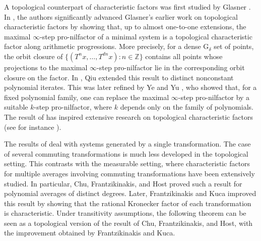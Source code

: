 \documentclass[11pt,reqno]{amsart}
\newcommand{\Z}{\mathbb{Z}}
\theoremstyle{definition}
\theoremstyle{remark}
\begin{document}
A topological counterpart of characteristic factors was first studied by Glasner \cite{Glasner_top_erg_decomposition:1994}.  In \cite{Glasner_Huang_Shao_Weiss_Ye_Topological_characteristic_factors:2020}, the authors significantly advanced Glasner’s earlier work on topological characteristic factors by showing that, up to almost one-to-one extensions, the maximal $\infty$-step pro-nilfactor of a minimal system is a topological characteristic factor along arithmetic progressions. More precisely, for a dense G$_\delta$ set of points, the orbit closure of $\{(T^nx,\dots,T^{dn}x):n\in \Z\}$ contains all points whose projections to the maximal $\infty$-step pro-nilfactor lie in the corresponding orbit closure on the factor.  In \cite{Qiu_poly_orbits_tot_minimal:2023}, Qiu extended this result to distinct nonconstant polynomial iterates. This was later refined by Ye and Yu \cite{Ye_Yu_polynomial_saturation:2025}, who showed that, for a fixed polynomial family, one can replace the maximal $\infty$-step pro-nilfactor by a suitable $k$-step pro-nilfactor, where $k$ depends only on the family of polynomials. The result of \cite{Glasner_Huang_Shao_Weiss_Ye_Topological_characteristic_factors:2020} has inspired extensive research on topological characteristic factors (see for instance \cite{Alvarez_regionally_proximal_tfc_group_actions:2026,Qiu_poly_orbits_tot_minimal:2023,Qiu_Yu_saturated_cubes_measure:2023,Shao_Xu_saturation_R_flows:2025,Qiu_Xu_Ye_Yu_saturation_product:2025,Wu_Yu_saturation_product_pol:2026}).

The results of \cite{Glasner_Huang_Shao_Weiss_Ye_Topological_characteristic_factors:2020,Qiu_poly_orbits_tot_minimal:2023,Ye_Yu_polynomial_saturation:2025} deal with systems generated by a single transformation. The case of several commuting transformations is much less developed in the topological setting. This contrasts with the measurable setting, where characteristic factors for multiple averages involving commuting transformations have been extensively studied. In particular, Chu, Frantzikinakis, and Host \cite{Chu_Frantzikinakis_Host_ergodic_averages_distinct_degree:2011} proved such a result for polynomial averages of distinct degrees. Later, Frantzikinakis and Kuca {\cite[Theorem 2.10]{Frantzikinakis_Kuca_joint_erg_comm_poly:2025}} improved this result by showing that the rational Kronecker factor of each transformation is characteristic. Under transitivity assumptions, the following theorem can be seen as a topological version of the result of Chu, Frantzikinakis, and Host, with the improvement obtained by Frantzikinakis and Kuca.
\end{document}
